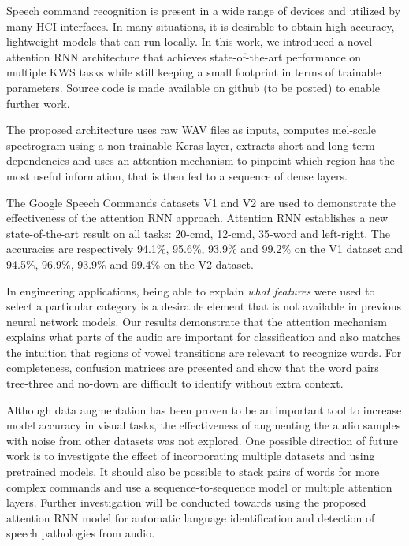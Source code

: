 \documentclass[authoryear, review, 12pt, 3p]{elsarticle}
\begin{document}
Speech command recognition is present in a wide range of devices and utilized by many HCI interfaces. In many situations, it is desirable to obtain high accuracy, lightweight models that can run locally. In this work, we introduced a novel attention RNN architecture that achieves state-of-the-art performance on multiple KWS tasks while still keeping a small footprint in terms of trainable parameters. Source code is made available on github (to be posted) to enable further work.

The proposed architecture uses raw WAV files as inputs, computes mel-scale spectrogram using a non-trainable Keras layer, extracts short and long-term dependencies and uses an attention mechanism to pinpoint which region has the most useful information, that is then fed to a sequence of dense layers.

The Google Speech Commands datasets V1 and V2 \cite{DBLP:journals/corr/abs-1804-03209} are used to demonstrate the effectiveness of the attention RNN approach. Attention RNN establishes a new state-of-the-art result on all tasks: 20-cmd, 12-cmd, 35-word and left-right. The accuracies are respectively 94.1\%, 95.6\%, 93.9\% and 99.2\% on the V1 dataset and 94.5\%, 96.9\%, 93.9\% and 99.4\% on the V2 dataset.

In engineering applications, being able to explain \emph{what features} were used to select a particular category is a desirable element that is not available in previous neural network models. Our results demonstrate that the attention mechanism explains what parts of the audio are important for classification and also matches the intuition that regions of vowel transitions are relevant to recognize words. For completeness, confusion matrices are presented and show that the word pairs tree-three and no-down are difficult to identify without extra context.

Although data augmentation has been proven to be an important tool to increase model accuracy in visual tasks, the effectiveness of augmenting the audio samples with noise from other datasets was not explored. One possible direction of future work is to investigate the effect of incorporating multiple datasets and using pretrained models. It should also be possible to stack pairs of words for more complex commands and use a sequence-to-sequence model or multiple attention layers. Further investigation will be conducted towards using the proposed attention RNN model for automatic language identification and detection of speech pathologies from audio.












\appendix
\end{document}
